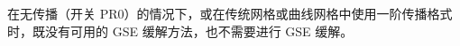 
\vspace{\baselineskip}
\vspace{\baselineskip}


\noindent
在无传播（开关 {\code PR0}）的情况下，或在传统网格或曲线网格中使用一阶传播格式时，既没有可用的 GSE 缓解方法，也不需要进行 GSE 缓解。

